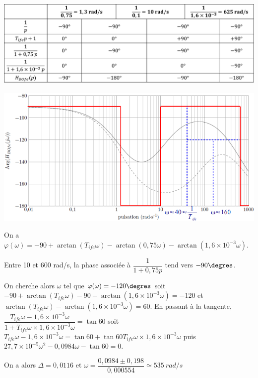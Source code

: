 \question{}
\ifprof
\begin{corrige}~\\
\begin{center}
\includegraphics[width=.7\linewidth]{images/cor_18}
\end{center}

\begin{center}
\includegraphics[width=.7\linewidth]{images/cor_18_bode}
\end{center}
\end{corrige}
\else
\fi


\question{}
\ifprof
\begin{corrige}
On a $\varphi(\omega)=-90 +\arctan \left( T_{ife} \omega \right)-\arctan \left( 0,75 \omega \right)-\arctan \left( 1,6\times 10^{-3} \omega \right)$.

Entre 10 et 600 \si{rad/s}, la phase associée à $\dfrac{1}{1+0,75p}$ tend vers $-90\degres$.

On cherche alors $\omega$ tel que $\varphi(\omega) = -120\degres$ soit 
$-90 +\arctan \left( T_{ife} \omega \right)-90-\arctan \left( 1,6\times 10^{-3} \omega \right) = -120 $ et  
$\arctan \left( T_{ife} \omega \right)-\arctan \left( 1,6\times 10^{-3} \omega \right) = 60 $.
En passant à la tangente,
$ \dfrac{ T_{ife} \omega - 1,6\times 10^{-3} \omega }{1+ T_{ife} \omega \times 1,6\times 10^{-3} \omega } = \tan 60$
soit 
$  T_{ife} \omega - 1,6\times 10^{-3} \omega = \tan 60+ \tan 60 T_{ife} \omega \times 1,6\times 10^{-3} \omega $
puis
$    27,7\times 10^{-5} \omega^2 -  0,0984 \omega  - \tan 60 = 0$.


On a alors $\Delta= 0,0116$ et $\omega = \dfrac{0,0984\pm 0,198}{0,000554}\simeq \SI{535}{rad/s}$

\end{corrige}
\else
\fi


